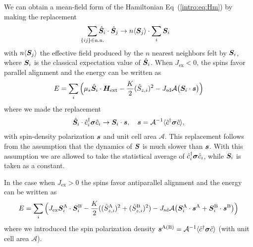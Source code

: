 We can obtain a mean-field form of the Hamiltonian Eq~(\ref{intro:eq:Hm}) by making the replacement
\begin{equation}
    \sum_{\mathclap{\{ij\}\in\text{n.n.}}} \hat{\bb{S}}_i\cdot\hat{\bb{S}}_j\rightarrow n\langle\bb{S}_j\rangle\cdot\sum_i \bb{S}_i
    \label{eq:meanfield}
\end{equation}
with $n \langle \boldsymbol{S}_j\rangle$ the effective field produced by the $n$ nearest neighbors felt by $\boldsymbol{S}_i$, where $\boldsymbol{S}_i$ is the classical expectation value of $\hat{\boldsymbol{S}}_i$.  When $J_\text{ex}<0$, the spins favor parallel alignment and the energy can be written as
\begin{equation}
    E = \sum_{i} \Big(\mu_s \hat{\boldsymbol{S}}_i\cdot \boldsymbol{H}_{\text{ext}}
    - \frac{K}{2}(\hat{S}_{z,i})^2
    -J_{\text{sd}}\mathcal{A}\big(\boldsymbol{S}_i\cdot\boldsymbol{s}\big)
        \Big)
        \label{intro:eq:E1}
\end{equation}
where we made the replacement
\begin{align}
    \hat{\boldsymbol{S}}_i\cdot\hat{c}_i^\dagger\boldsymbol{\sigma}\hat{c}_i \rightarrow \boldsymbol{S}_i\cdot\boldsymbol{s}, \quad \boldsymbol{s} = \mathcal{A}^{-1}\langle \hat{c}^\dagger \boldsymbol{\sigma}\hat{c}\rangle,
\end{align}
with spin-density polarization $\boldsymbol{s}$ and unit cell area $\mathcal{A}$. This replacement follows from the assumption that the dynamics of $\boldsymbol{S}$ is much slower than $\boldsymbol{s}$. With this assumption we are allowed to take the statistical average of $\hat{c}_i^\dagger\boldsymbol{\sigma}\hat{c}_i$, while $\boldsymbol{S}_i$ is taken as a constant.

In the case when $J_\text{ex}>0$ the spins favor antiparallel alignment and the energy can be written as
\begin{equation}
    E = \sum_{i} \Big(J_{\text{ex}}\boldsymbol{S}^\text{A}_i\cdot\boldsymbol{S}^\text{B}_i 
    - \frac{K}{2}((\hat{S}_{z,i}^\text{A})^2+(\hat{S}_{z,i}^\text{B})^2)
    -J_{\text{sd}}\mathcal{A}\big(\boldsymbol{S}^\text{A}_i\cdot\boldsymbol{s}^\text{A}+\boldsymbol{S}^\text{B}_i\cdot\boldsymbol{s}^\text{B}\big)
        \Big)
        \label{intro:eq:E2}
\end{equation}
where we introduced the spin polarization density $\boldsymbol{s}^\text{A(B)} = \mathcal{A}^{-1}\langle \hat{c}^\dagger \boldsymbol{\sigma}\hat{c}\rangle$ (with unit cell area $\mathcal{A}$). 

